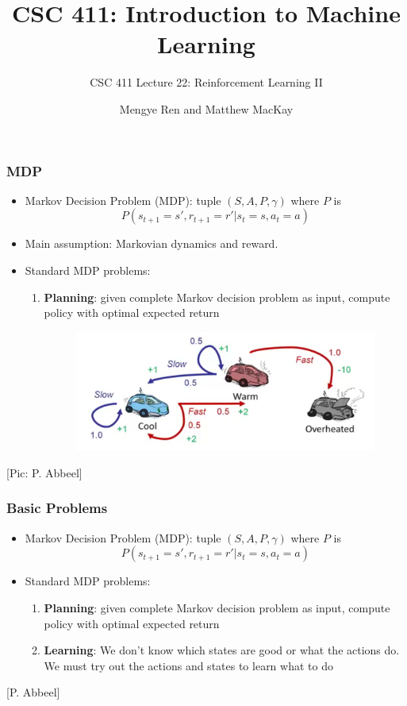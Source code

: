 \documentclass{beamer}
\title[CSC411 2019 Winter Lecture 22]{CSC 411: Introduction to Machine Learning}
\subtitle{CSC 411 Lecture 22: Reinforcement Learning II}
\author[UofT]{Mengye Ren and Matthew MacKay}
\institute[]{University of Toronto}
\date{}
\renewcommand{\high}{\textbf}
\begin{document}
\begin{frame}
  \titlepage
\end{frame}

\begin{frame}\frametitle{MDP}\small
\begin{itemize}
\item Markov Decision Problem (MDP): tuple $(S,A,P,\gamma)$ where $P$ is
\[
P(s_{t+1}=s', r_{t+1}=r' | s_t = s, a_t = a)
\]
\item Main assumption: Markovian dynamics and reward.
\item Standard MDP problems:
\begin{enumerate}
\item  \high{Planning}: given complete Markov decision problem as input, compute policy with optimal expected return
\begin{figure}
\includegraphics[width=0.7\linewidth]{Figures/rll6} 
\end{figure}
\end{enumerate}
\end{itemize}
\scriptsize [Pic: P. Abbeel]
\end{frame}

\begin{frame}\frametitle{Basic Problems}\small
\begin{itemize}
\item Markov Decision Problem (MDP): tuple $(S,A,P,\gamma)$ where $P$ is
\[
P(s_{t+1}=s', r_{t+1}=r' | s_t = s, a_t = a)
\]
\item Standard MDP problems:
\begin{enumerate}
\item  \high{Planning}: given complete Markov decision problem as input, compute policy with optimal expected return\\[1mm]
\item \high{Learning}: We don't know which states are good or what the actions do. We must try out the actions and states to learn what to do
\end{enumerate}
\end{itemize}
\vspace{28mm}
\scriptsize [P. Abbeel]
\end{frame}
\end{document}
